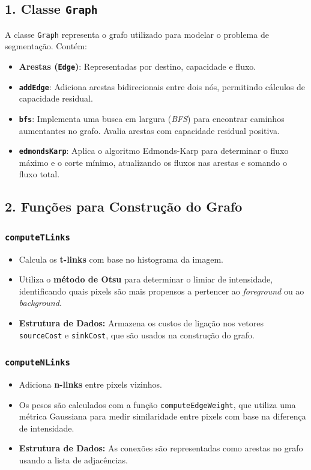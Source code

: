 \documentclass[12pt]{article}
\begin{document}
\subsection*{1. Classe \texttt{Graph}}

A classe \texttt{Graph} representa o grafo utilizado para modelar o problema de segmentação. Contém:
\begin{itemize}
    \item \textbf{Arestas (\texttt{Edge})}: Representadas por destino, capacidade e fluxo.
    \item \textbf{\texttt{addEdge}}: Adiciona arestas bidirecionais entre dois nós, permitindo cálculos de capacidade residual.
    \item \textbf{\texttt{bfs}}: Implementa uma busca em largura (\textit{BFS}) para encontrar caminhos aumentantes no grafo. Avalia arestas com capacidade residual positiva.
    \item \textbf{\texttt{edmondsKarp}}: Aplica o algoritmo Edmonds-Karp para determinar o fluxo máximo e o corte mínimo, atualizando os fluxos nas arestas e somando o fluxo total.
\end{itemize}

\subsection*{2. Funções para Construção do Grafo}

\subsubsection*{\texttt{computeTLinks}}
\begin{itemize}
    \item Calcula os \textbf{t-links} com base no histograma da imagem.
    \item Utiliza o \textbf{método de Otsu} para determinar o limiar de intensidade, identificando quais pixels são mais propensos a pertencer ao \textit{foreground} ou ao \textit{background}.
    \item \textbf{Estrutura de Dados:} Armazena os custos de ligação nos vetores \texttt{sourceCost} e \texttt{sinkCost}, que são usados na construção do grafo.
\end{itemize}

\subsubsection*{\texttt{computeNLinks}}
\begin{itemize}
    \item Adiciona \textbf{n-links} entre pixels vizinhos. 
    \item Os pesos são calculados com a função \texttt{computeEdgeWeight}, que utiliza uma métrica Gaussiana para medir similaridade entre pixels com base na diferença de intensidade.
    \item \textbf{Estrutura de Dados:} As conexões são representadas como arestas no grafo usando a lista de adjacências.
\end{itemize}
\end{document}
